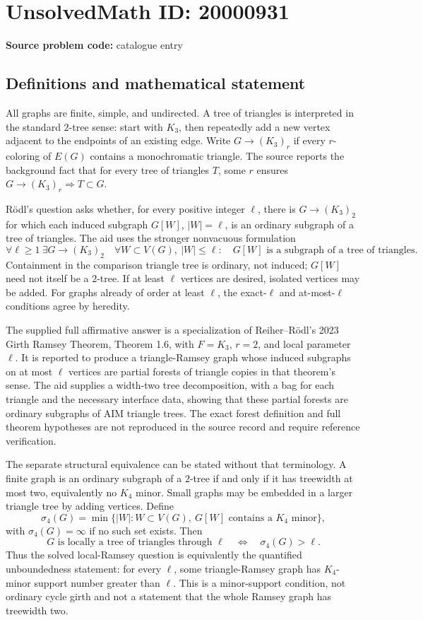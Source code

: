 \documentclass[11pt]{article}
\begin{document}
\section*{UnsolvedMath ID: 20000931}
\textbf{Source problem code:} catalogue entry
\subsection{Definitions and mathematical statement}
All graphs are finite, simple, and undirected. A tree of triangles is interpreted in the standard \(2\)-tree sense: start with \(K_3\), then repeatedly add a new vertex adjacent to the endpoints of an existing edge. Write \(G\to(K_3)_r\) if every \(r\)-coloring of \(E(G)\) contains a monochromatic triangle. The source reports the background fact that for every tree of triangles \(T\), some \(r\) ensures \(G\to(K_3)_r\Rightarrow T\subset G\).

R\"odl's question asks whether, for every positive integer \(\ell\), there is \(G\to(K_3)_2\) for which each induced subgraph \(G[W]\), \(|W|=\ell\), is an ordinary subgraph of a tree of triangles. The aid uses the stronger nonvacuous formulation
\[
 \forall\ell\geq1\ \exists G\to(K_3)_2\quad
 \forall W\subset V(G),\ |W|\leq\ell:\quad
 G[W]\text{ is a subgraph of a tree of triangles}.
\]
Containment in the comparison triangle tree is ordinary, not induced; \(G[W]\) need not itself be a \(2\)-tree. If at least \(\ell\) vertices are desired, isolated vertices may be added. For graphs already of order at least \(\ell\), the exact-\(\ell\) and at-most-\(\ell\) conditions agree by heredity.

The supplied full affirmative answer is a specialization of Reiher--R\"odl's 2023 Girth Ramsey Theorem, Theorem 1.6, with \(F=K_3\), \(r=2\), and local parameter \(\ell\). It is reported to produce a triangle-Ramsey graph whose induced subgraphs on at most \(\ell\) vertices are partial forests of triangle copies in that theorem's sense. The aid supplies a width-two tree decomposition, with a bag for each triangle and the necessary interface data, showing that these partial forests are ordinary subgraphs of AIM triangle trees. The exact forest definition and full theorem hypotheses are not reproduced in the source record and require reference verification.

The separate structural equivalence can be stated without that terminology. A finite graph is an ordinary subgraph of a \(2\)-tree if and only if it has treewidth at most two, equivalently no \(K_4\) minor. Small graphs may be embedded in a larger triangle tree by adding vertices. Define
\[
 \sigma_4(G)=\min\{|W|:W\subset V(G),\ G[W]\text{ contains a }K_4\text{ minor}\},
\]
with \(\sigma_4(G)=\infty\) if no such set exists. Then
\[
 G\text{ is locally a tree of triangles through }\ell
 \quad\Longleftrightarrow\quad\sigma_4(G)>\ell.
\]
Thus the solved local-Ramsey question is equivalently the quantified unboundedness statement: for every \(\ell\), some triangle-Ramsey graph has \(K_4\)-minor support number greater than \(\ell\). This is a minor-support condition, not ordinary cycle girth and not a statement that the whole Ramsey graph has treewidth two.
\end{document}
